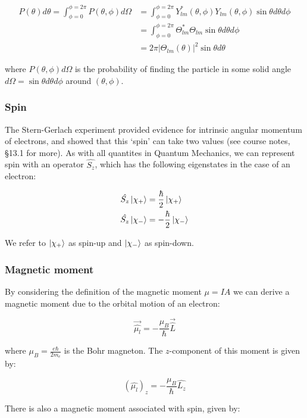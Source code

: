 \begin{align*} 
P(\theta)d\theta = \int_{\phi=0}^{\phi=2\pi} P(\theta, \phi) d\Omega &= \int_{\phi=0}^{\phi=2\pi} Y^*_{lm}(\theta, \phi) Y_{lm}(\theta, \phi) \sin{\theta} d\theta d\phi \\
&= \int_{\phi=0}^{\phi=2\pi} \Theta_{lm}^* \Theta_{lm} \sin{\theta} d\theta d\phi \\
&= 2\pi \left| \Theta_{lm}(\theta)\right|^2 \sin{\theta} d\theta
\end{align*}

where $P(\theta, \phi) d\Omega$ is the probability of finding the particle in some solid angle $d\Omega = \sin{\theta} d\theta d\phi$ around $(\theta, \phi)$.

\subsubsection{Spin}

The Stern-Gerlach experiment provided evidence for intrinsic angular momentum of electrons, and showed that this `spin' can take two values (see course notes, §13.1 for more). As with all quantites in Quantum Mechanics, we can represent spin with an operator $\hat{S_z}$, which has the following eigenstates in the case of an electron:

\begin{align*}
\hat{S_z}\ket{\chi_+} &= \frac{\hbar}{2}\ket{\chi_+} \\
\hat{S_z}\ket{\chi_-} &=  -\frac{\hbar}{2}\ket{\chi_-}
\end{align*}

We refer to $\ket{\chi_+}$ as spin-up and $\ket{\chi_-}$ as spin-down.

\subsubsection*{Magnetic moment}

By considering the definition of the magnetic moment $\mu = IA$ we can derive a magnetic moment due to the orbital motion of an electron:

\[ \vec{\hat{\mu_l}} = -\frac{\mu_B}{\hbar} \vec{\hat{L}} \]

where $\mu_B = \frac{e\hbar}{2m_e}$ is the Bohr magneton. The $z$-component of this moment is given by:

\[ (\hat{\mu_l})_z = -\frac{\mu_B}{\hbar} \hat{L_z} \]

There is also a magnetic moment associated with spin, given by:


